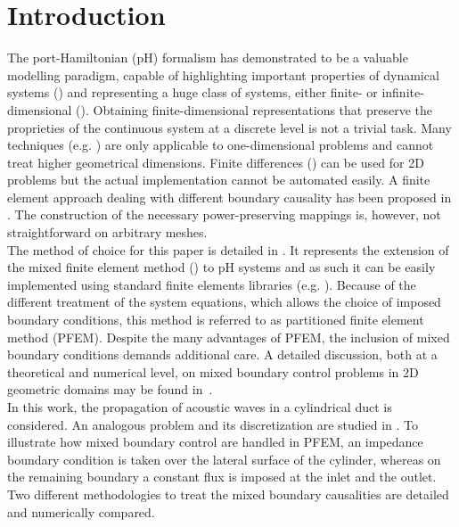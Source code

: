 \documentclass{ifacconf}
\begin{document}
\section{Introduction}
The port-Hamiltonian (pH) formalism has demonstrated to be a valuable modelling paradigm, capable of highlighting important properties of dynamical systems (\cite{bookPHs}) and representing a huge class of systems, either finite- or infinite-dimensional (\cite{VANDERSCHAFT2002}). Obtaining finite-dimensional representations that preserve the proprieties of the continuous system at a discrete level is not a trivial task. Many techniques (e.g. \cite{moulla:hal-01625008}) are only applicable to one-dimensional problems and cannot treat higher geometrical dimensions. Finite differences (\cite{Trenchant}) can be used for 2D problems but the actual implementation cannot be automated easily. A finite element approach dealing with different boundary causality has been proposed in \cite{WeakForm_Kot}. The construction of the necessary power-preserving mappings is, however, not straightforward on arbitrary meshes. \\

The method of choice for this paper is detailed in \cite{cardoso2019partitioned}. It represents the extension of the mixed finite element method (\cite{Gatica}) to pH systems and as such it can be easily implemented using standard finite elements libraries (e.g. \cite{LoggMardalEtAl2012}). Because of the different treatment of the system equations, which allows the choice of imposed boundary conditions, this method is referred to as partitioned finite element method (PFEM). Despite the many advantages of PFEM, the inclusion of mixed boundary conditions demands additional care. A detailed discussion, both at a theoretical and numerical level, on mixed boundary control problems in 2D geometric domains may be found in~\cite{Grisvard}.\\

In this work, the propagation of acoustic waves in a cylindrical duct is considered. An analogous problem and its discretization are studied in \cite{WU2015206}. To illustrate how mixed boundary control are handled in PFEM, an impedance boundary condition is taken over the lateral surface of the cylinder, whereas on the remaining boundary a constant flux is imposed at the inlet and the outlet. Two different methodologies to treat the mixed boundary causalities are detailed and numerically compared.   \\
\end{document}

